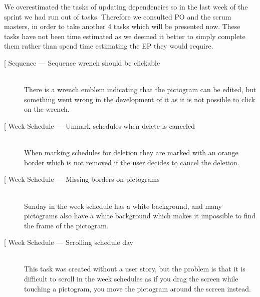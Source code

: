 We overestimated the tasks of updating dependencies so in the last week of the sprint we had run out of tasks.
Therefore we consulted PO and the scrum masters, in order to take another 4 tasks which will be presented now.
These tasks have not been time estimated as we deemed it better to simply complete them rather than spend time estimating the EP they would require.

\begin{description}
    \item[{[}\phigh{]} Sequence --- Sequence wrench should be clickable] \hfill \\
        There is a wrench emblem indicating that the pictogram can be edited, but something went wrong in the development of it as it is not possible to click on the wrench.
    \item[{[}\phigh{]} Week Schedule --- Unmark schedules when delete is canceled] \hfill \\
        When marking schedules for deletion they are marked with an orange border which is not removed if the user decides to cancel the deletion.
    \item[{[}\phigh{]} Week Schedule --- Missing borders on pictograms] \hfill \\
        Sunday in the week schedule has a white background, and many pictograms also have a white background which makes it impossible to find the frame of the pictogram.
    \item[{[}\phigh{]} Week Schedule --- Scrolling schedule day] \hfill\\
        This task was created without a user story, but the problem is that it is difficult to scroll in the week schedules as if you drag the screen while touching a pictogram, you move the pictogram around the screen instead.
\end{description}
